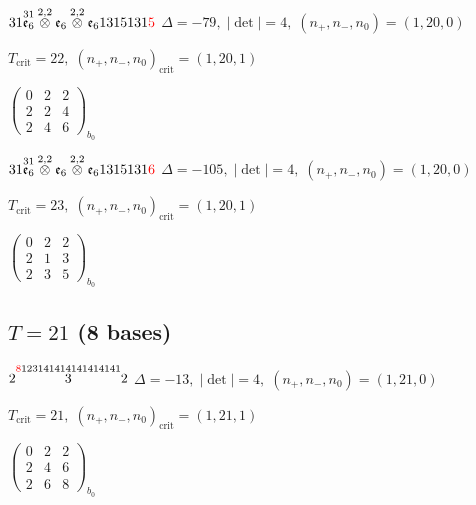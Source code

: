\documentclass[10pt]{article}
\begin{document}
\smallskip

$31\overset{31}{\mathfrak{e}_6}\overset{2,2}{\otimes}\mathfrak{e}_6\overset{2,2}{\otimes}\mathfrak{e}_61315131\textcolor{red}{5}$ \quad $\Delta=-79,\; |\det|=4,\; (n_+,n_-,n_0)=(1,20,0)$

\hspace{1em}$T_{\text{crit}}=22,\; (n_+,n_-,n_0)_{\text{crit}}=(1,20,1)$

\hspace{2em}$\left(\begin{smallmatrix}0 & 2 & 2 \\ 2 & 2 & 4 \\ 2 & 4 & 6\end{smallmatrix}\right)_{\!b_0}$

$31\overset{31}{\mathfrak{e}_6}\overset{2,2}{\otimes}\mathfrak{e}_6\overset{2,2}{\otimes}\mathfrak{e}_61315131\textcolor{red}{6}$ \quad $\Delta=-105,\; |\det|=4,\; (n_+,n_-,n_0)=(1,20,0)$

\hspace{1em}$T_{\text{crit}}=23,\; (n_+,n_-,n_0)_{\text{crit}}=(1,20,1)$

\hspace{2em}$\left(\begin{smallmatrix}0 & 2 & 2 \\ 2 & 1 & 3 \\ 2 & 3 & 5\end{smallmatrix}\right)_{\!b_0}$


\subsection*{$T = 21$ \quad (8 bases)}
\smallskip

$2\overset{\textcolor{red}{8}123141414141414141}{3}2$ \quad $\Delta=-13,\; |\det|=4,\; (n_+,n_-,n_0)=(1,21,0)$

\hspace{1em}$T_{\text{crit}}=21,\; (n_+,n_-,n_0)_{\text{crit}}=(1,21,1)$

\hspace{2em}$\left(\begin{smallmatrix}0 & 2 & 2 \\ 2 & 4 & 6 \\ 2 & 6 & 8\end{smallmatrix}\right)_{\!b_0}$
\end{document}
